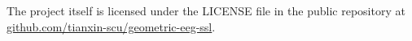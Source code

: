 \documentclass[11pt]{article}
\begin{document}
The project itself is licensed under the LICENSE file in the public
repository at
\href{https://github.com/tianxin-scu/geometric-eeg-ssl}{github.com/tianxin-scu/geometric-eeg-ssl}.


{\footnotesize

}
\end{document}

